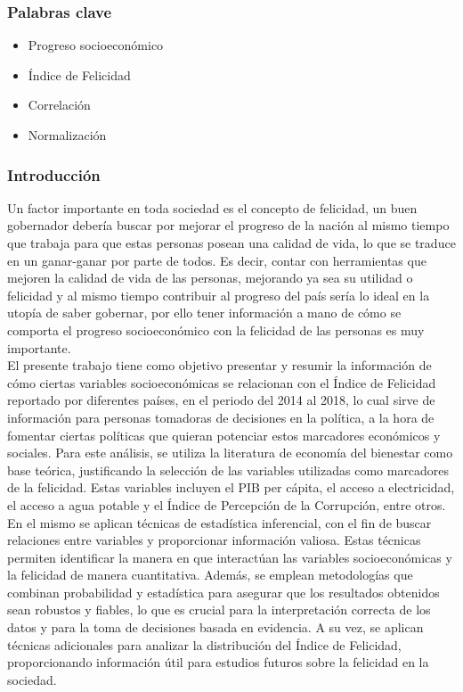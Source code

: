 \subsubsection{Palabras clave}
\begin{multicols}{2}
    \begin{itemize}
        \item Progreso socioeconómico
        \item Índice de Felicidad
        \item Correlación
        \item Normalización
    \end{itemize}
\end{multicols}

\subsubsection{Introducción}
Un factor importante en toda sociedad es el concepto de felicidad, un buen gobernador debería buscar por mejorar el progreso de la nación al mismo tiempo que trabaja para que estas personas posean una calidad de vida, lo que se traduce en un ganar-ganar por parte de todos. Es decir, contar con herramientas que mejoren la calidad de vida de las personas, mejorando ya sea su utilidad o felicidad y al mismo tiempo contribuir al progreso del país sería lo ideal en la utopía de saber gobernar, por ello tener información a mano de cómo se comporta el progreso socioeconómico con la felicidad de las personas es muy importante. \\

El presente trabajo tiene como objetivo presentar y resumir la información de cómo ciertas variables socioeconómicas se relacionan con el Índice de Felicidad reportado por diferentes países, en el periodo del 2014 al 2018, lo cual sirve de información para personas tomadoras de decisiones en la política, a la hora de fomentar ciertas políticas que quieran potenciar estos marcadores económicos y sociales. Para este análisis, se utiliza la literatura de economía del bienestar como base teórica, justificando la selección de las variables utilizadas como marcadores de la felicidad. Estas variables incluyen el PIB per cápita, el acceso a electricidad, el acceso a agua potable y el Índice de Percepción de la Corrupción, entre otros. \\

En el mismo se aplican técnicas de estadística inferencial, con el fin de buscar relaciones entre variables y proporcionar información valiosa. Estas técnicas permiten identificar la manera en que interactúan las variables socioeconómicas y la felicidad de manera cuantitativa. Además, se emplean metodologías que combinan probabilidad y estadística para asegurar que los resultados obtenidos sean robustos y fiables, lo que es crucial para la interpretación correcta de los datos y para la toma de decisiones basada en evidencia. A su vez, se aplican técnicas adicionales para analizar la distribución del Índice de Felicidad, proporcionando información útil para estudios futuros sobre la felicidad en la sociedad. \\

